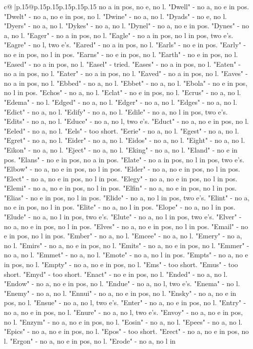 \documentclass{article}
\begin{document}
{\begin{supertabular}{c@{$\;$}|p{.15\linewidth}@{}p{.15\linewidth}p{.15\linewidth}p{.15\linewidth}p{.15\linewidth}p{.15\linewidth}}
{{{no a in pos, no e, no l. "Dwell" {-} no a, no e in pos. "Dwelt" {-} no a, no e in pos, no l. "Dwine" {-} no a, no l. "Dyads" {-} no e, no l. "Dyers" {-} no a, no l. "Dykes" {-} no a, no l. "Dynel" {-} no a, no e in pos. "Dynes" {-} no a, no l. "Eager" {-} no a in pos, no l. "Eagle" {-} no a in pos, no l in pos, two e's. "Eagre" {-} no l, two e's. "Eared" {-} no a in pos, no l. "Earls" {-} no e in pos. "Early" {-} no e in pos, no l in pos. "Earns" {-} no e in pos, no l. "Earth" {-} no e in pos, no l. "Eased" {-} no a in pos, no l. "Easel" {-} tried. "Eases" {-} no a in pos, no l. "Eaten" {-} no a in pos, no l. "Eater" {-} no a in pos, no l. "Eaved" {-} no a in pos, no l. "Eaves" {-} no a in pos, no l. "Ebbed" {-} no a, no l. "Ebbet" {-} no a, no l. "Ebola" {-} no e in pos, no l in pos. "Echos" {-} no a, no l. "Eclat" {-} no e in pos, no l. "Ecrus" {-} no a, no l. "Edema" {-} no l. "Edged" {-} no a, no l. "Edger" {-} no a, no l. "Edges" {-} no a, no l. "Edict" {-} no a, no l. "Edify" {-} no a, no l. "Edile" {-} no a, no l in pos, two e's. "Edits" {-} no a, no l. "Educe" {-} no a, no l, two e's. "Educt" {-} no a, no e in pos, no l. "Eeled" {-} no a, no l. "Eels" {-} too short. "Eerie" {-} no a, no l. "Egest" {-} no a, no l. "Egret" {-} no a, no l. "Eider" {-} no a, no l. "Eidos" {-} no a, no l. "Eight" {-} no a, no l. "Eikon" {-} no a, no l. "Eject" {-} no a, no l. "Eking" {-} no a, no l. "Eland" {-} no e in pos. "Elans" {-} no e in pos, no a in pos. "Elate" {-} no a in pos, no l in pos, two e's. "Elbow" {-} no a, no e in pos, no l in pos. "Elder" {-} no a, no e in pos, no l in pos. "Elect" {-} no a, no e in pos, no l in pos. "Elegy" {-} no a, no e in pos, no l in pos. "Elemi" {-} no a, no e in pos, no l in pos. "Elfin" {-} no a, no e in pos, no l in pos. "Elias" {-} no e in pos, no l in pos. "Elide" {-} no a, no l in pos, two e's. "Elint" {-} no a, no e in pos, no l in pos. "Elite" {-} no a, no l in pos. "Elope" {-} no a, no l in pos. "Elude" {-} no a, no l in pos, two e's. "Elute" {-} no a, no l in pos, two e's. "Elver" {-} no a, no e in pos, no l in pos. "Elves" {-} no a, no e in pos, no l in pos. "Email" {-} no e in pos, no l in pos. "Ember" {-} no a, no l. "Emcee" {-} no a, no l. "Emery" {-} no a, no l. "Emirs" {-} no a, no e in pos, no l. "Emits" {-} no a, no e in pos, no l. "Emmer" {-} no a, no l. "Emmet" {-} no a, no l. "Emote" {-} no a, no l in pos. "Empts" {-} no a, no e in pos, no l. "Empty" {-} no a, no e in pos, no l. "Ems" {-} too short. "Emus" {-} too short. "Emyd" {-} too short. "Enact" {-} no e in pos, no l. "Ended" {-} no a, no l. "Endow" {-} no a, no e in pos, no l. "Endue" {-} no a, no l, two e's. "Enema" {-} no l. "Enemy" {-} no a, no l. "Ennui" {-} no a, no e in pos, no l. "Ensky" {-} no a, no e in pos, no l. "Ensue" {-} no a, no l, two e's. "Enter" {-} no a, no e in pos, no l. "Entry" {-} no a, no e in pos, no l. "Enure" {-} no a, no l, two e's. "Envoy" {-} no a, no e in pos, no l. "Enzym" {-} no a, no e in pos, no l. "Eosin" {-} no a, no l. "Epees" {-} no a, no l. "Epics" {-} no a, no e in pos, no l. "Epos" {-} too short. "Erect" {-} no a, no e in pos, no l. "Ergon" {-} no a, no e in pos, no l. "Erode" {-} no a, no l in }}}
\end{supertabular}}
\end{document}
